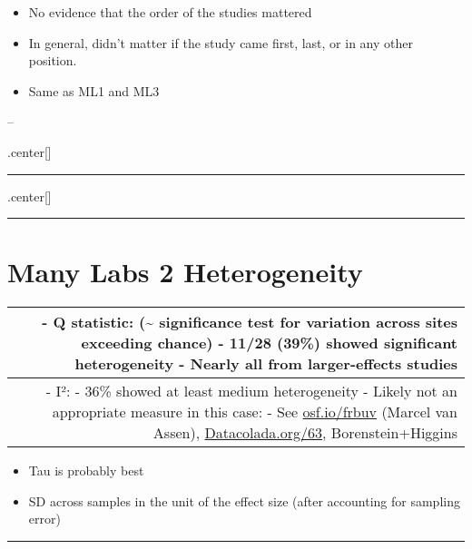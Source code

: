 \documentclass[]{article}
\providecommand{\tightlist}{%
  \setlength{\itemsep}{0pt}\setlength{\parskip}{0pt}}
\begin{document}
\begin{itemize}
\tightlist
\item
  No evidence that the order of the studies mattered
\item
  In general, didn't matter if the study came first, last, or in any
  other position.
\item
  Same as ML1 and ML3
\end{itemize}

--

.center{[}{]}

\begin{center}\rule{0.5\linewidth}{\linethickness}\end{center}

.center{[}{]}

\begin{center}\rule{0.5\linewidth}{\linethickness}\end{center}

\section{Many Labs 2 Heterogeneity}\label{many-labs-2-heterogeneity}

\begin{longtable}[]{@{}r@{}}
\toprule
\begin{minipage}[b]{0.03\columnwidth}\raggedleft\strut
- Q statistic: (\textasciitilde{} significance test for variation across
sites exceeding chance) - 11/28 (39\%) showed significant heterogeneity
- Nearly all from larger-effects studies\strut
\end{minipage}\tabularnewline
\midrule
\endhead
\begin{minipage}[t]{0.03\columnwidth}\raggedleft\strut
- I²: - 36\% showed at least medium heterogeneity - Likely not an
appropriate measure in this case: - See \url{osf.io/frbuv} (Marcel van
Assen), \url{Datacolada.org/63}, Borenstein+Higgins\strut
\end{minipage}\tabularnewline
\bottomrule
\end{longtable}

\begin{itemize}
\tightlist
\item
  Tau is probably best
\item
  SD across samples in the unit of the effect size (after accounting for
  sampling error)
\end{itemize}

\begin{center}\rule{0.5\linewidth}{\linethickness}\end{center}
\end{document}
